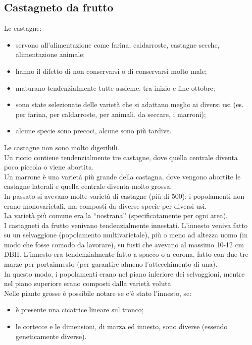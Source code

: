 \subsection{Castagneto da frutto}
Le castagne:
\begin{itemize}[nosep]
    \item servono all'alimentazione come farina, caldarroste, castagne secche, alimentazione animale;
    \item hanno il difetto di non conservarsi o di conservarsi molto male;
    \item maturano tendenzialmente tutte assieme, tra inizio e fine ottobre;
    \item sono state selezionate delle varietà che si adattano meglio ai diversi usi (es. per farina, per caldarroste, per animali, da seccare, i marroni);
    \item alcune specie sono precoci, alcune sono più tardive.
\end{itemize}
Le castagne non sono molto digeribili.\\
Un riccio contiene tendenzialmente tre castagne, dove quella centrale diventa poco piccola o viene abortita.\\
Un marrone è una varietà più grande della castagna, dove vengono abortite le castagne laterali e quella centrale diventa molto grossa.\\
In passato si avevano molte varietà di castagne (più di 500): i popolamenti non erano monovarietali, ma composti da diverse specie per diversi usi.\\
La varietà più comune era la ``nostrana'' (specificatamente per ogni area).\\
I castagneti da frutto venivano tendenzialmente innestati. L'innesto veniva fatto su un selvaggione (popolamento multivarietale), più o meno ad altezza uomo (in modo che fosse comodo da lavorare), su fusti che avevano al massimo 10-12 cm DBH. L'innesto era tendenzialmente fatto a spacco o a corona, fatto con due-tre marze per portainnesto (per garantire almeno l'attecchimento di una).\\
In questo modo, i popolamenti erano nel piano inferiore dei selvaggioni, mentre nel piano superiore erano composti dalla varietà voluta\\
Nelle piante grosse è possibile notare se c'è stato l'innesto, se:
\begin{itemize}[nosep]
    \item è presente una cicatrice lineare sul tronco;
    \item le cortecce e le dimensioni, di marza ed innesto, sono diverse (essendo geneticamente diverse).
\end{itemize}
